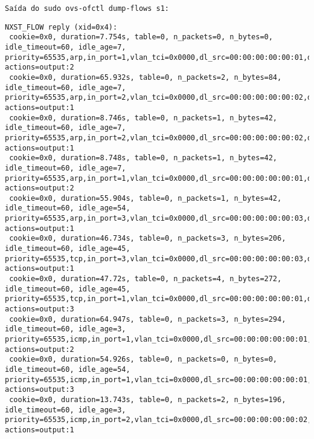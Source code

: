 \documentclass[12pt,letterpaper]{article}
\begin{document}
\texttt{Saída do sudo ovs-ofctl dump-flows s1:} \newline
\begin{verbatim}
NXST_FLOW reply (xid=0x4):
 cookie=0x0, duration=7.754s, table=0, n_packets=0, n_bytes=0, idle_timeout=60, idle_age=7, priority=65535,arp,in_port=1,vlan_tci=0x0000,dl_src=00:00:00:00:00:01,dl_dst=00:00:00:00:00:02,arp_spa=10.0.0.1,arp_tpa=10.0.0.2,arp_op=2 actions=output:2
 cookie=0x0, duration=65.932s, table=0, n_packets=2, n_bytes=84, idle_timeout=60, idle_age=7, priority=65535,arp,in_port=2,vlan_tci=0x0000,dl_src=00:00:00:00:00:02,dl_dst=00:00:00:00:00:01,arp_spa=10.0.0.2,arp_tpa=10.0.0.1,arp_op=2 actions=output:1
 cookie=0x0, duration=8.746s, table=0, n_packets=1, n_bytes=42, idle_timeout=60, idle_age=7, priority=65535,arp,in_port=2,vlan_tci=0x0000,dl_src=00:00:00:00:00:02,dl_dst=00:00:00:00:00:01,arp_spa=10.0.0.2,arp_tpa=10.0.0.1,arp_op=1 actions=output:1
 cookie=0x0, duration=8.748s, table=0, n_packets=1, n_bytes=42, idle_timeout=60, idle_age=7, priority=65535,arp,in_port=1,vlan_tci=0x0000,dl_src=00:00:00:00:00:01,dl_dst=00:00:00:00:00:02,arp_spa=10.0.0.1,arp_tpa=10.0.0.2,arp_op=1 actions=output:2
 cookie=0x0, duration=55.904s, table=0, n_packets=1, n_bytes=42, idle_timeout=60, idle_age=54, priority=65535,arp,in_port=3,vlan_tci=0x0000,dl_src=00:00:00:00:00:03,dl_dst=00:00:00:00:00:01,arp_spa=10.0.0.3,arp_tpa=10.0.0.1,arp_op=2 actions=output:1
 cookie=0x0, duration=46.734s, table=0, n_packets=3, n_bytes=206, idle_timeout=60, idle_age=45, priority=65535,tcp,in_port=3,vlan_tci=0x0000,dl_src=00:00:00:00:00:03,dl_dst=00:00:00:00:00:01,nw_src=10.0.0.3,nw_dst=10.0.0.1,nw_tos=0,tp_src=5001,tp_dst=35980 actions=output:1
 cookie=0x0, duration=47.72s, table=0, n_packets=4, n_bytes=272, idle_timeout=60, idle_age=45, priority=65535,tcp,in_port=1,vlan_tci=0x0000,dl_src=00:00:00:00:00:01,dl_dst=00:00:00:00:00:03,nw_src=10.0.0.1,nw_dst=10.0.0.3,nw_tos=16,tp_src=35980,tp_dst=5001 actions=output:3
 cookie=0x0, duration=64.947s, table=0, n_packets=3, n_bytes=294, idle_timeout=60, idle_age=3, priority=65535,icmp,in_port=1,vlan_tci=0x0000,dl_src=00:00:00:00:00:01,dl_dst=00:00:00:00:00:02,nw_src=10.0.0.1,nw_dst=10.0.0.2,nw_tos=0,icmp_type=8,icmp_code=0 actions=output:2
 cookie=0x0, duration=54.926s, table=0, n_packets=0, n_bytes=0, idle_timeout=60, idle_age=54, priority=65535,icmp,in_port=1,vlan_tci=0x0000,dl_src=00:00:00:00:00:01,dl_dst=00:00:00:00:00:03,nw_src=10.0.0.1,nw_dst=10.0.0.3,nw_tos=0,icmp_type=8,icmp_code=0 actions=output:3
 cookie=0x0, duration=13.743s, table=0, n_packets=2, n_bytes=196, idle_timeout=60, idle_age=3, priority=65535,icmp,in_port=2,vlan_tci=0x0000,dl_src=00:00:00:00:00:02,dl_dst=00:00:00:00:00:01,nw_src=10.0.0.2,nw_dst=10.0.0.1,nw_tos=0,icmp_type=0,icmp_code=0 actions=output:1

\end{verbatim}
\end{document}

